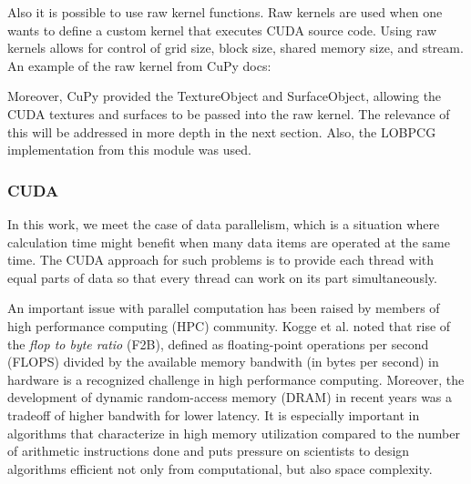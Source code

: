 Also it is possible to use raw kernel functions. Raw kernels are used when one wants to define a custom kernel that executes CUDA source code. Using raw kernels allows for control of grid size, block size, shared memory size, and stream. An example of the raw kernel from CuPy docs\cite{cupy_raw_kernel}:

\vspace{0.2cm}


Moreover, CuPy provided the TextureObject\cite{cupy_texture} and SurfaceObject\cite{cupy_surface}, allowing the CUDA textures and surfaces to be passed into the raw kernel. The relevance of this will be addressed in more depth in the next section. Also, the LOBPCG implementation from this module was used.\cite{cupy_lobpcg}


\subsubsection{CUDA}

In this work, we meet the case of data parallelism\cite{cheng2014professional}, which is a situation where calculation time might benefit when many data items are operated at the same time. The CUDA approach for such problems is to provide each thread with equal parts of data so that every thread can work on its part simultaneously.

An important issue with parallel computation has been raised by members of high performance computing (HPC) community. Kogge et al. noted that rise of the \textit{flop to byte ratio} (F2B), defined as floating-point operations per second (FLOPS) divided by the available memory bandwith (in bytes per second) in hardware is a recognized challenge in high performance computing. Moreover, the development of dynamic random-access memory (DRAM) in recent years was a tradeoff of higher bandwith for lower latency.\cite{kogge2008exascale} It is especially important in algorithms that characterize in high memory utilization compared to the number of arithmetic instructions done and puts pressure on scientists to design algorithms efficient not only from computational, but also space complexity.\cite{krotkiewski2011efficient}

\vspace{0.2cm}

